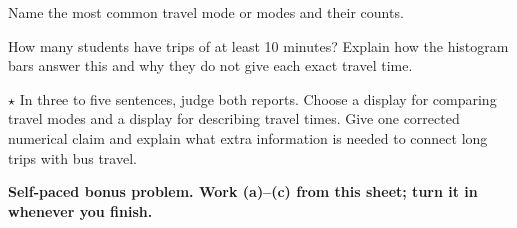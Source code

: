 \documentclass[12pt]{extarticle}
\begin{document}
\begin{description}[leftmargin=1.15in, labelwidth=1in, itemsep=2pt, topsep=2pt]
  \item[\dokbadge{1}~(a)] Name the most common travel mode or modes and their counts.
  \item[\dokbadge{2}~(b)] How many students have trips of at least 10 minutes? Explain how the histogram bars answer this and why they do not give each exact travel time.
  \item[\dokbadge{3}~(c)] $\star$ In three to five sentences, judge both reports. Choose a display for comparing travel modes and a display for describing travel times. Give one corrected numerical claim and explain what extra information is needed to connect long trips with bus travel.
\end{description}

\vfill
\textbf{Self-paced bonus problem. Work (a)--(c) from this sheet; turn it in whenever you finish.}
\end{document}
